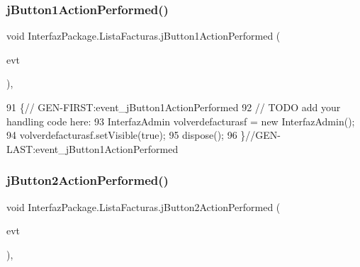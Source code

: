 \mbox{\label{class_interfaz_package_1_1_lista_facturas_ae41b741de1678a6ab365994321b47a87}} 
\subsubsection{\texorpdfstring{j\+Button1\+Action\+Performed()}{jButton1ActionPerformed()}}
{\footnotesize\ttfamily void Interfaz\+Package.\+Lista\+Facturas.\+j\+Button1\+Action\+Performed (\begin{DoxyParamCaption}\item[{java.\+awt.\+event.\+Action\+Event}]{evt }\end{DoxyParamCaption})\hspace{0.3cm}{\ttfamily [inline]}, {\ttfamily [private]}}


\begin{DoxyCode}
91                                                                          \{\textcolor{comment}{//
      GEN-FIRST:event\_jButton1ActionPerformed}
92         \textcolor{comment}{// TODO add your handling code here:}
93         InterfazAdmin volverdefacturasf = \textcolor{keyword}{new} InterfazAdmin();
94         volverdefacturasf.setVisible(\textcolor{keyword}{true});
95         dispose();
96     \}\textcolor{comment}{//GEN-LAST:event\_jButton1ActionPerformed}
\end{DoxyCode}
\mbox{\label{class_interfaz_package_1_1_lista_facturas_a1393fa71e900a876db02c2f07f33f237}} 
\subsubsection{\texorpdfstring{j\+Button2\+Action\+Performed()}{jButton2ActionPerformed()}}
{\footnotesize\ttfamily void Interfaz\+Package.\+Lista\+Facturas.\+j\+Button2\+Action\+Performed (\begin{DoxyParamCaption}\item[{java.\+awt.\+event.\+Action\+Event}]{evt }\end{DoxyParamCaption})\hspace{0.3cm}{\ttfamily [inline]}, {\ttfamily [private]}}


